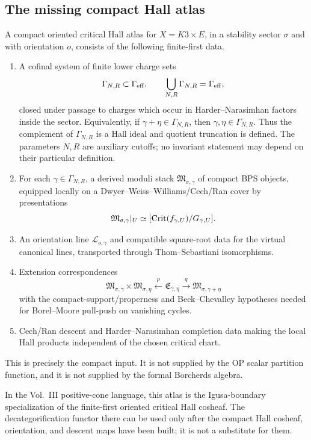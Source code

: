 \subsection{The missing compact Hall atlas}

A compact oriented critical Hall atlas for \(X=K3\times E\), in a
stability sector \(\sigma\) and with orientation \(o\), consists of the
following finite-first data.

\begin{enumerate}
\item A cofinal system of finite lower charge sets
  \[
    \Gamma_{N,R}\subset\Gamma_{\mathrm{eff}},\qquad
    \bigcup_{N,R}\Gamma_{N,R}=\Gamma_{\mathrm{eff}},
  \]
  closed under passage to charges which occur in Harder--Narasimhan
  factors inside the sector.  Equivalently, if
  \(\gamma+\eta\in\Gamma_{N,R}\), then
  \(\gamma,\eta\in\Gamma_{N,R}\).  Thus the complement of
  \(\Gamma_{N,R}\) is a Hall ideal and quotient truncation is defined.
  The parameters \(N,R\) are auxiliary cutoffs; no invariant statement
  may depend on their particular definition.
\item For each \(\gamma\in\Gamma_{N,R}\), a derived moduli stack
  \(\mathfrak M_{\sigma,\gamma}\) of compact BPS objects, equipped
  locally on a Dwyer--Weiss--Williams/Cech/Ran cover by presentations
  \[
    \mathfrak M_{\sigma,\gamma}|_U\simeq
    [\operatorname{Crit}(f_{\gamma,U})/G_{\gamma,U}].
  \]
\item An orientation line \(\mathscr L_{o,\gamma}\) and compatible
  square-root data for the virtual canonical lines, transported through
  Thom--Sebastiani isomorphisms.
\item Extension correspondences
  \[
    \mathfrak M_{\sigma,\gamma}\times\mathfrak M_{\sigma,\eta}
    \xleftarrow{\ p\ }
    \mathfrak E_{\gamma,\eta}
    \xrightarrow{\ q\ }
    \mathfrak M_{\sigma,\gamma+\eta}
  \]
  with the compact-support/properness and Beck--Chevalley hypotheses
  needed for Borel--Moore pull-push on vanishing cycles.
\item Cech/Ran descent and Harder--Narasimhan completion data making the
  local Hall products independent of the chosen critical chart.
\end{enumerate}

This is precisely the compact input.  It is not supplied by the OP
scalar partition function, and it is not supplied by the formal
Borcherds algebra.

In the Vol.~III positive-cone language, this atlas is the Igusa-boundary
specialization of the finite-first oriented critical Hall cosheaf.  The
decategorification functor there can be used only after the compact
Hall cosheaf, orientation, and descent maps have been built; it is not a
substitute for them.

